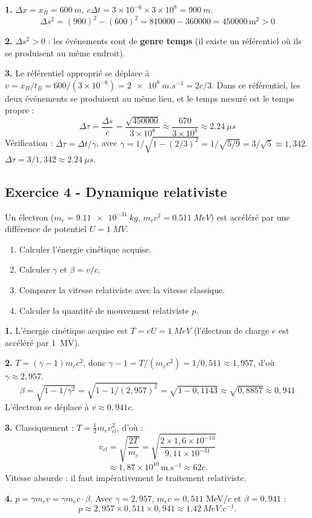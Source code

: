 \documentclass[12pt,a4paper]{article}
\begin{document}
\begin{boitecorrige}
\textbf{1.} $\Delta x = x_B = \qty{600}{m}$, $c\Delta t = 3\times10^{-6}\times3\times10^8 = \qty{900}{m}$.
\[
\Delta s^2 = (900)^2 - (600)^2 = 810000 - 360000 = 450000\,\text{m}^2 > 0
\]

\textbf{2.} $\Delta s^2 > 0$ : les événements sont de \textbf{genre temps} (il existe un référentiel où ils se produisent au même endroit).

\textbf{3.} Le référentiel approprié se déplace à $v = x_B/t_B = 600/(3\times10^{-6}) = \qty{2e8}{m.s^{-1}} = 2c/3$. Dans ce référentiel, les deux événements se produisent au même lieu, et le temps mesuré est le temps propre :
\[
\Delta\tau = \frac{\Delta s}{c} = \frac{\sqrt{450000}}{3\times10^8} \approx \frac{670}{3\times10^8} \approx \qty{2.24}{\mu s}
\]
Vérification : $\Delta\tau = \Delta t/\gamma$, avec $\gamma = 1/\sqrt{1-(2/3)^2} = 1/\sqrt{5/9} = 3/\sqrt{5}\approx1{,}342$. $\Delta\tau = 3/1{,}342 \approx \qty{2.24}{\mu s}$.
\end{boitecorrige}

\subsection*{Exercice 4 - Dynamique relativiste \niveau{\difficile}}

\begin{boiteexercice}
Un électron ($m_e = \qty{9.11e-31}{kg}$, $m_ec^2 = \qty{0.511}{MeV}$) est accéléré par une différence de potentiel $U = \qty{1}{MV}$.
\begin{enumerate}
  \item Calculer l'énergie cinétique acquise.
  \item Calculer $\gamma$ et $\beta = v/c$.
  \item Comparer la vitesse relativiste avec la vitesse classique.
  \item Calculer la quantité de mouvement relativiste $p$.
\end{enumerate}
\end{boiteexercice}

\begin{boitecorrige}
\textbf{1.} L'énergie cinétique acquise est $T = eU = \qty{1}{MeV}$ (l'électron de charge $e$ est accéléré par \qty{1}{MV}).

\textbf{2.} $T = (\gamma - 1)m_ec^2$, donc $\gamma - 1 = T/(m_ec^2) = 1/0{,}511 \approx 1{,}957$, d'où $\gamma \approx 2{,}957$.
\[
\beta = \sqrt{1-1/\gamma^2} = \sqrt{1-1/(2{,}957)^2} = \sqrt{1-0{,}1143} \approx \sqrt{0{,}8857} \approx 0{,}941
\]
L'électron se déplace à $v \approx 0{,}941c$.

\textbf{3.} Classiquement : $T = \frac{1}{2}m_ev_{cl}^2$, d'où :
\[
v_{cl} = \sqrt{\frac{2T}{m_e}}
     = \sqrt{\frac{2\times1{,}6\times10^{-13}}{9{,}11\times10^{-31}}}
\]
\[
\approx 1{,}87\times10^{10}\,\text{m.s}^{-1} \approx 62c.
\]
Vitesse absurde : il faut impérativement le traitement relativiste.

\textbf{4.} $p = \gamma m_e v = \gamma m_ec\cdot\beta$. Avec $\gamma = 2{,}957$, $m_ec = 0{,}511$ MeV/$c$ et $\beta = 0{,}941$ :
\[
p \approx 2{,}957\times 0{,}511\times 0{,}941 \approx \qty{1.42}{MeV.c^{-1}}.
\]
\end{boitecorrige}
\end{document}
